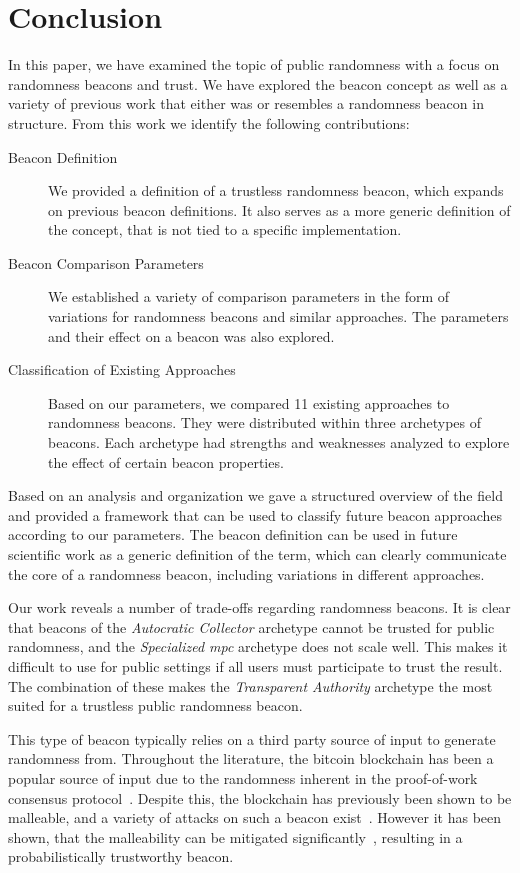 \section{Conclusion}\label{sec:conclusion}
In this paper, we have examined the topic of public randomness with a focus on randomness beacons and trust.
We have explored the beacon concept as well as a variety of previous work that either was or resembles a randomness beacon in structure.
From this work we identify the following contributions:

\begin{description}
    \item [Beacon Definition] We provided a definition of a trustless randomness beacon, which expands on previous beacon definitions.
It also serves as a more generic definition of the concept, that is not tied to a specific implementation.
    \item [Beacon Comparison Parameters] We established a variety of comparison parameters in the form of variations for randomness beacons and similar approaches.
The parameters and their effect on a beacon was also explored.
    \item [Classification of Existing Approaches] Based on our parameters, we compared 11 existing approaches to randomness beacons.
They were distributed within three archetypes of beacons.
Each archetype had strengths and weaknesses analyzed to explore the effect of certain beacon properties.
\end{description}

Based on an analysis and organization we gave a structured overview of the field and provided a framework that can be used to classify future beacon approaches according to our parameters.
The beacon definition can be used in future scientific work as a generic definition of the term, which can clearly communicate the core of a randomness beacon, including variations in different approaches.

Our work reveals a number of trade-offs regarding randomness beacons.
It is clear that beacons of the \emph{Autocratic Collector} archetype cannot be trusted for public randomness, and the \emph{Specialized \gls{mpc}} archetype does not scale well.
This makes it difficult to use for public settings if all users must participate to trust the result.
The combination of these makes the \emph{Transparent Authority} archetype the most suited for a trustless public randomness beacon.

This type of beacon typically relies on a third party source of input to generate randomness from.
Throughout the literature, the bitcoin blockchain has been a popular source of input due to the randomness inherent in the proof-of-work consensus protocol~\cite{bonneau2015bitcoin}.
Despite this, the blockchain has previously been shown to be malleable, and a variety of attacks on such a beacon exist~\cite{bonneau2015bitcoin, bentov2016bitcoin, pierrot2016malleability}.
However it has been shown, that the malleability can be mitigated significantly~\cite{bunz2017proofsof}, resulting in a probabilistically trustworthy beacon.

